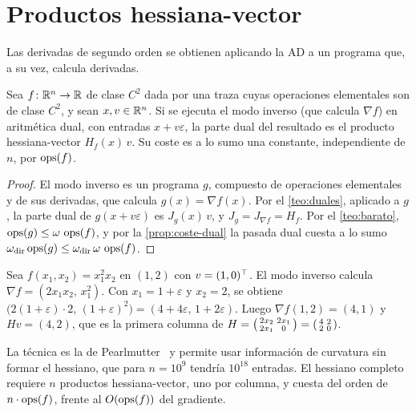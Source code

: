 \section{Productos hessiana-vector}

Las derivadas de segundo orden se obtienen aplicando la AD a un programa que, a su vez, calcula derivadas.

\begin{proposicion}\label{prop:hvp}
Sea $f\colon\mathbb{R}^{n}\to\mathbb{R}$ de clase $C^{2}$ dada por una traza cuyas operaciones elementales son de clase $C^{2}$, y sean $x,v\in\mathbb{R}^{n}$. Si se ejecuta el modo inverso (que calcula $\nabla f$) en aritmética dual, con entradas $x+v\varepsilon$, la parte dual del resultado es el producto hessiana-vector $H_f(x)\,v$. Su coste es a lo sumo una constante, independiente de $n$, por $\operatorname{ops}(f)$.
\end{proposicion}

\begin{proof}
El modo inverso es un programa $g$, compuesto de operaciones elementales y de sus derivadas, que calcula $g(x)=\nabla f(x)$. Por el \cref{teo:duales}, aplicado a $g$, la parte dual de $g(x+v\varepsilon)$ es $J_g(x)\,v$, y $J_g=J_{\nabla f}=H_f$. Por el \cref{teo:barato}, $\operatorname{ops}(g)\le\omega\,\operatorname{ops}(f)$, y por la \cref{prop:coste-dual} la pasada dual cuesta a lo sumo $\omega_{\mathrm{dir}}\operatorname{ops}(g)\le\omega_{\mathrm{dir}}\,\omega\,\operatorname{ops}(f)$.
\end{proof}

\begin{ejemplo}\label{ej:hvp}
Sea $f(x_1,x_2)=x_1^{2}x_2$ en $(1,2)$ con $v=(1,0)^{\top}$. El modo inverso calcula $\nabla f=(2x_1x_2,\,x_1^{2})$. Con $x_1=1+\varepsilon$ y $x_2=2$, se obtiene $\bigl(2(1+\varepsilon)\cdot 2,\,(1+\varepsilon)^{2}\bigr)=(4+4\varepsilon,\,1+2\varepsilon)$. Luego $\nabla f(1,2)=(4,1)$ y $Hv=(4,2)$, que es la primera columna de $H=\begin{psmallmatrix}2x_2&2x_1\\2x_1&0\end{psmallmatrix}=\begin{psmallmatrix}4&2\\2&0\end{psmallmatrix}$.
\end{ejemplo}

La técnica es la de Pearlmutter~\cite{pearlmutter} y permite usar información de curvatura sin formar el hessiano, que para $n=10^{9}$ tendría $10^{18}$ entradas. El hessiano completo requiere $n$ productos hessiana-vector, uno por columna, y cuesta del orden de $n\cdot\operatorname{ops}(f)$, frente al $O(\operatorname{ops}(f))$ del gradiente.

